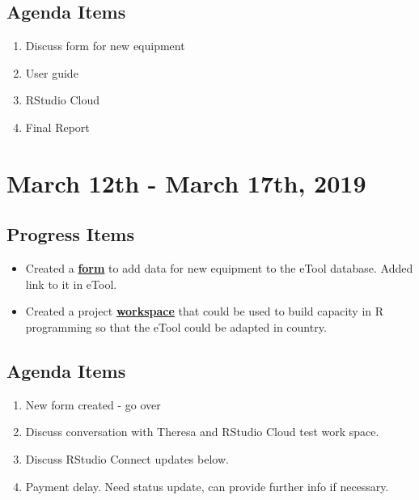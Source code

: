 \documentclass[]{article}
\providecommand{\tightlist}{%
  \setlength{\itemsep}{0pt}\setlength{\parskip}{0pt}}
\begin{document}
\hypertarget{agenda-items-2}{%
\subsection{Agenda Items}\label{agenda-items-2}}

\begin{enumerate}
\def\labelenumi{\arabic{enumi}.}
\tightlist
\item
  Discuss form for new equipment
\item
  User guide
\item
  RStudio Cloud
\item
  Final Report
\end{enumerate}

\hypertarget{march-12th---march-17th-2019}{%
\section{March 12th - March 17th,
2019}\label{march-12th---march-17th-2019}}

\hypertarget{progress-items-3}{%
\subsection{Progress Items}\label{progress-items-3}}

\begin{itemize}
\tightlist
\item
  Created a
  \textbf{\href{https://travis-shinin-spot.shinyapps.io/new_equip_form/}{form}}
  to add data for new equipment to the eTool database. Added link to it
  in eTool.
\item
  Created a project
  \textbf{\href{https://rstudio.cloud/project/255745}{workspace}} that
  could be used to build capacity in R programming so that the eTool
  could be adapted in country.
\end{itemize}

\hypertarget{agenda-items-3}{%
\subsection{Agenda Items}\label{agenda-items-3}}

\begin{enumerate}
\def\labelenumi{\arabic{enumi}.}
\tightlist
\item
  New form created - go over
\item
  Discuss conversation with Theresa and RStudio Cloud test work space.
\item
  Discuss RStudio Connect updates below.
\item
  Payment delay. Need status update, can provide further info if
  necessary.
\end{enumerate}
\end{document}
